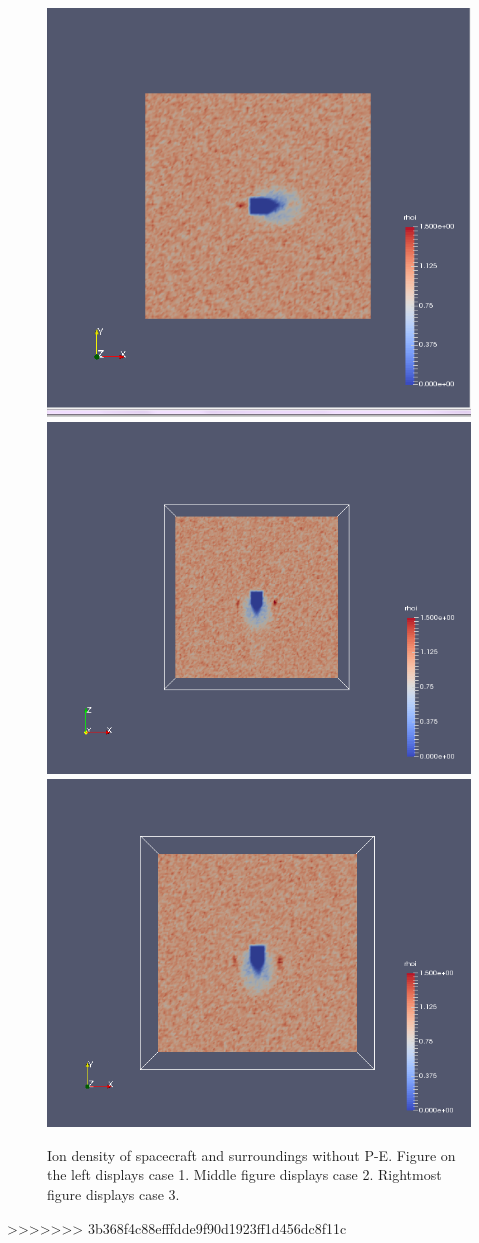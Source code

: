     \begin{figure}
        \includegraphics[width = 0.3 \textwidth]{images/ion density case1}
        \includegraphics[width = 0.3 \textwidth]{images/ion density x-z case2}
	 \includegraphics[width = 0.3 \textwidth]{images/ion density x-y case3}
        \caption{Ion density of spacecraft and surroundings without P-E. Figure on the left displays case 1. Middle figure displays case 2. Rightmost figure displays case 3.}
    \end{figure}
>>>>>>> 3b368f4c88efffdde9f90d1923ff1d456dc8f11c
